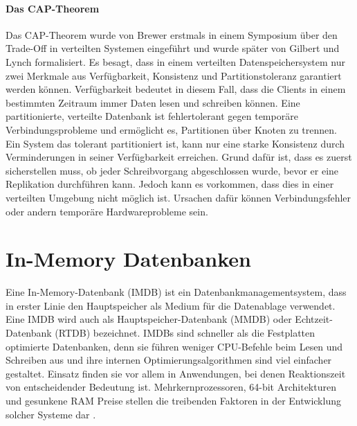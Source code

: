 \paragraph{Das CAP-Theorem} Das CAP-Theorem wurde von Brewer erstmals in einem Symposium \cite{cap2010} über den Trade-Off in verteilten Systemen eingeführt und wurde später von Gilbert und Lynch \cite{Gilbert:2002:BCF:564585.564601} formalisiert. Es besagt, dass in einem verteilten Datenspeichersystem nur zwei Merkmale aus Verfügbarkeit, Konsistenz und  Partitionstoleranz garantiert werden können. Verfügbarkeit bedeutet in diesem Fall, dass die Clients in einem bestimmten Zeitraum immer Daten lesen und schreiben können. Eine partitionierte, verteilte Datenbank ist fehlertolerant gegen temporäre Verbindungsprobleme und ermöglicht es, Partitionen über Knoten zu trennen. Ein System das tolerant partitioniert ist, kann nur eine starke Konsistenz durch Verminderungen in seiner Verfügbarkeit erreichen. Grund dafür ist, dass es zuerst sicherstellen muss, ob jeder Schreibvorgang abgeschlossen wurde, bevor er eine Replikation durchführen kann. Jedoch kann es vorkommen, dass dies in einer verteilten Umgebung nicht möglich ist. Ursachen dafür können Verbindungsfehler oder andern temporäre Hardwareprobleme sein.

\section{In-Memory Datenbanken}
\label{ch:grundlagen:sec:InMemoryDatenbanken}

Eine In-Memory-Datenbank (IMDB) ist ein Datenbankmanagementsystem, dass in erster Linie den Hauptspeicher als Medium für die Datenablage verwendet. Eine IMDB wird auch als Hauptspeicher-Datenbank (MMDB) oder Echtzeit-Datenbank (RTDB) bezeichnet. IMDBs sind schneller als die Festplatten optimierte Datenbanken, denn sie führen weniger CPU-Befehle beim Lesen und Schreiben aus und ihre internen Optimierungsalgorithmen sind viel einfacher gestaltet. Einsatz finden sie vor allem in Anwendungen, bei denen Reaktionszeit von entscheidender Bedeutung ist. Mehrkernprozessoren, 64-bit Architekturen und gesunkene RAM Preise stellen die treibenden Faktoren in der Entwicklung solcher Systeme dar \cite{SWB-381840476}.

